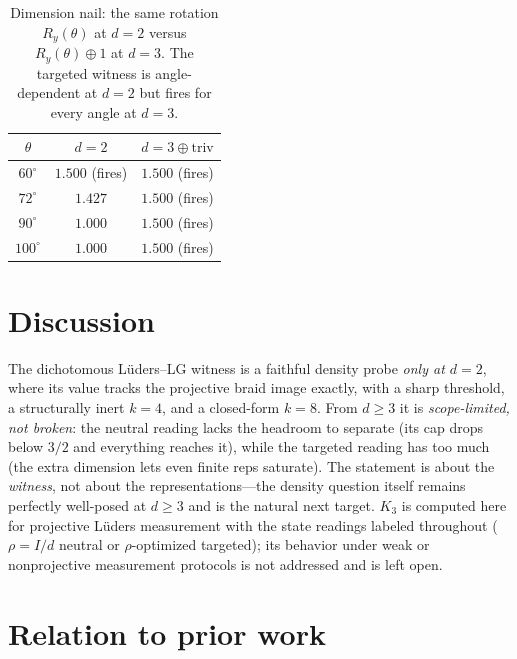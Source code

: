 \documentclass[aps,prx,reprint,amsmath,amssymb,floatfix,nofootinbib,superscriptaddress]{revtex4-2}
\begin{document}
\begin{table}[t]
\caption{Dimension nail: the same rotation $R_y(\theta)$ at $d=2$ versus
$R_y(\theta) \oplus 1$ at $d=3$. The targeted witness is angle-dependent at $d=2$ but
fires for every angle at $d=3$.}
\label{tab:nail}
\centering
\begin{tabular}{c c c}
\toprule
$\theta$ & $d=2$ & $d=3 \oplus \mathrm{triv}$ \\
\midrule
$60^\circ$  & $1.500$ (fires) & $1.500$ (fires) \\
$72^\circ$  & $1.427$         & $\mathbf{1.500}$ (fires) \\
$90^\circ$  & $1.000$         & $\mathbf{1.500}$ (fires) \\
$100^\circ$ & $1.000$         & $\mathbf{1.500}$ (fires) \\
\bottomrule
\end{tabular}
\end{table}

\section{Discussion}
\label{sec:disc}

The dichotomous L\"uders--LG witness is a faithful density probe \emph{only at $d=2$},
where its value tracks the projective braid image exactly, with a sharp threshold, a
structurally inert $k=4$, and a closed-form $k=8$. From $d \ge 3$ it is
\emph{scope-limited, not broken}: the neutral reading lacks the headroom to separate
(its cap drops below $3/2$ and everything reaches it), while the targeted reading has
too much (the extra dimension lets even finite reps saturate). The statement is about
the \emph{witness}, not about the representations---the density question itself
remains perfectly well-posed at $d \ge 3$ and is the natural next target. $K_3$ is
computed here for projective L\"uders measurement with the state readings labeled
throughout ($\rho=I/d$ neutral or $\rho$-optimized targeted); its behavior under
weak or nonprojective measurement protocols is not addressed and is left open.

\section{Relation to prior work}
\label{sec:prior}
\end{document}
